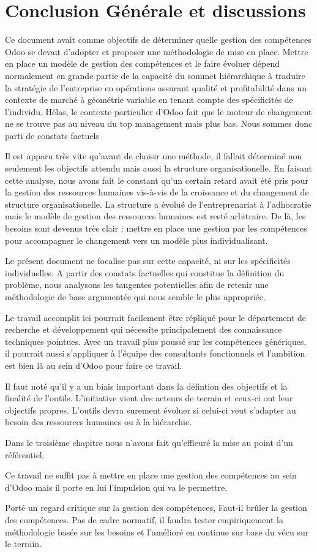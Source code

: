 \chapter*{Conclusion Générale et discussions}
Ce document avait comme objectifs de déterminer quelle gestion des compétences Odoo se devait d'adopter et proposer une méthodologie de mise en place.
Mettre en place un modèle de gestion des compétences et le faire évoluer dépend normalement en grande partie de la capacité du sommet hiérarchique à traduire la stratégie de l’entreprise en opérations assurant qualité et profitabilité dans un contexte de marché à géométrie variable en tenant compte des spécificités de l’individu. Hélas, le contexte particulier d'Odoo fait que le moteur de changement ne se trouve pas au niveau du top management mais plus bas. Nous sommes donc parti de constats factuels 


Il est apparu très vite qu'avant de choisir une méthode, il fallait déterminé non seulement les objectifs attendu mais aussi la structure organisationelle. En faisant cette analyse, nous avons fait le constant qu'un certain retard avait été pris pour la gestion des ressources humaines vis-à-vis de la croissance et du changement de structure organisationelle. La structure a évolué de l'entreprenariat à l'adhocratie mais le modèle de gestion des ressources humaines est resté arbitraire. De là, les besoins sont devenus très clair : mettre en place une gestion par les compétences pour accompagner le changement vers un modèle plus individualisant. 






Le présent document ne focalise pas sur cette capacité, ni sur les spécificités individuelles. A partir des constats factuelles qui constitue la définition du problème, nous analysons les tangentes potentielles afin de retenir une méthodologie de base argumentée qui nous semble le plus appropriée.


Le travail accomplit ici pourrait facilement être répliqué pour le département de recherche et développement qui nécessite principalement des connaissance techniques pointues. Avec un travail plus poussé sur les compétences génériques, il pourrait aussi s'appliquer à l'équipe des consultants fonctionnels et l'ambition est bien là au sein d'Odoo pour faire ce travail. 

Il faut noté qu'il y a un biais important dans la défintion des objectifs et la finalité de l'outils. L'initiative vient des acteurs de terrain et ceux-ci ont leur objectifs propres. L'outils devra surement évoluer si celui-ci veut s'adapter au besoin des ressources humaines ou à la hiérarchie. 

Dans le troisième chapitre nous n'avons fait qu'effleuré la mise au point d'un référentiel.

Ce travail ne suffit pas à mettre en place une gestion des compétences au sein d'Odoo mais il porte en lui l'impulsion qui va le permettre.  

Porté un regard critique sur la gestion des compétences, Faut-il brûler la gestion des compétences. Pas de cadre normatif, il faudra tester empiriquement la méthodologie basée sur les besoins et l'amélioré en continue sur base du vécu sur le terrain.\citep[pp.252-253]{competencesbruler2006}
